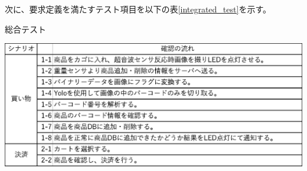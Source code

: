 次に、要求定義を満たすテスト項目を以下の表\ref{integrated_test}を示す。

\begin{table}[htbp]
\centering
\caption{総合テスト}
\includegraphics[width=15cm]{./pic/integrated_test.eps}
\label{integrated_test}
\end{table}